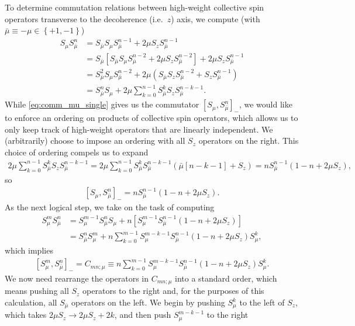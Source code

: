 \documentclass[aps,notitlepage,nofootinbib,11pt]{revtex4-1}
\newcommand{\p}[1]{\left(#1\right)} %
\renewcommand{\sp}[1]{\left[#1\right]} %
\renewcommand{\set}[1]{\left\{#1\right\}} %
\newcommand{\bmu}{{\bar\mu}}
\newcommand{\1}{\mathds{1}}
\begin{document}
To determine commutation relations between high-weight collective spin
operators transverse to the decoherence (i.e.~$z$) axis, we compute
(with $\bmu\equiv-\mu\in\set{+1,-1}$)
\begin{align}
  S_\mu S_\bmu^n
  &= S_\bmu S_\mu S_\bmu^{n-1} + 2\mu S_z S_\bmu^{n-1} \\
  &= S_\bmu \sp{S_\bmu S_\mu S_\bmu^{n-2} + 2\mu S_z S_\bmu^{n-2}}
  + 2\mu S_z S_\bmu^{n-1} \\
  &= S_\bmu^2 S_\mu S_\bmu^{n-2}
  + 2\mu \p{S_\bmu S_z S_\bmu ^{n-2} + S_z S_\bmu^{n-1}} \\
  &= S_\bmu^n S_\mu + 2\mu \sum_{k=0}^{n-1} S_\bmu^k S_z S_\bmu^{n-k-1}.
  \label{eq:comm_mu_single}
\end{align}
While \eqref{eq:comm_mu_single} gives us the commutator
$\sp{S_\mu,S_\bmu^n}_-$, we would like to enforce an ordering on
products of collective spin operators, which allows us to only keep
track of high-weight operators that are linearly independent.  We
(arbitrarily) choose to impose an ordering with all $S_z$ operators on
the right.  This choice of ordering compels us to expand
\begin{align}
  2 \mu \sum_{k=0}^{n-1} S_\bmu^k S_z S_\bmu^{n-k-1}
  = 2 \mu \sum_{k=0}^{n-1}
  S_\bmu^k S_\bmu^{n-k-1} \p{\bmu\sp{n-k-1} + S_z}
  = n S_\bmu^{n-1}\p{1 - n + 2\mu S_z},
\end{align}
so
\begin{align}
  \sp{S_\mu, S_\bmu^n}_-
  = n S_\bmu^{n-1}\p{1 - n + 2\mu S_z}.
\end{align}
As the next logical step, we take on the task of computing
\begin{align}
  S_\mu^m S_\bmu^n
  &= S_\mu^{m-1} S_\bmu^n S_\mu
  + n \sp{S_\mu^{m-1} S_\bmu^{n-1} \p{1 - n + 2\mu S_z}} \\
  &= S_\bmu^n S_\mu^m
  + n \sum_{k=0}^{m-1} S_\mu^{m-k-1} S_\bmu^{n-1}
  \p{1 - n + 2\mu S_z} S_\mu^k,
\end{align}
which implies
\begin{align}
  \sp{S_\mu^m, S_\bmu^n}_-
  = C_{mn;\mu}
  \equiv n \sum_{k=0}^{m-1} S_\mu^{m-k-1} S_\bmu^{n-1}
  \p{1 - n + 2\mu S_z} S_\mu^k.
\end{align}
We now need rearrange the operators in $C_{mn;\mu}$ into a standard
order, which means pushing all $S_z$ operators to the right and, for
the purposes of this calculation, all $S_\bmu$ operators on the left.
We begin by pushing $S_\mu^k$ to the left of $S_z$, which takes
$2\mu S_z\to 2\mu S_z+2k$, and then push $S_\mu^{m-k-1}$ to the right
\end{document}
